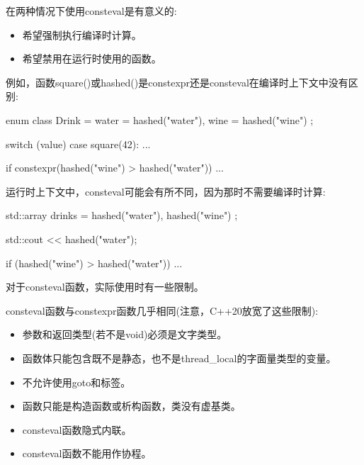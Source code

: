 在两种情况下使用consteval是有意义的:

\begin{itemize}
\item
希望强制执行编译时计算。

\item
希望禁用在运行时使用的函数。
\end{itemize}

例如，函数square()或hashed()是constexpr还是consteval在编译时上下文中没有区别:

\begin{cpp}
enum class Drink = { water = hashed("water"), wine = hashed("wine") };

switch (value) {
	case square(42):
	...
}

if constexpr(hashed("wine") > hashed("water")) {
	...
}
\end{cpp}

运行时上下文中，consteval可能会有所不同，因为那时不需要编译时计算:

\begin{cpp}
std::array drinks = { hashed("water"), hashed("wine") };

std::cout << hashed("water");

if (hashed("wine") > hashed("water")) {
	...
}
\end{cpp}


对于consteval函数，实际使用时有一些限制。


consteval函数与constexpr函数几乎相同(注意，C++20放宽了这些限制):

\begin{itemize}
\item
参数和返回类型(若不是void)必须是文字类型。

\item
函数体只能包含既不是静态，也不是thread\_local的字面量类型的变量。

\item
不允许使用goto和标签。

\item
函数只能是构造函数或析构函数，类没有虚基类。

\item
consteval函数隐式内联。

\item
consteval函数不能用作协程。
\end{itemize}


